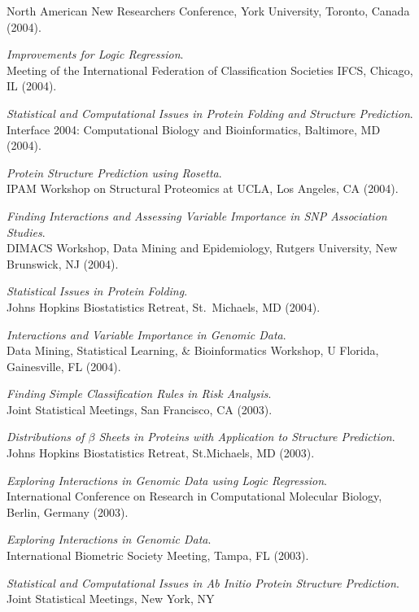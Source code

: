 \documentclass[10pt]{article}
\newcommand{\dn}[1]{{\color{black} {#1}}}
\begin{document}
North American New Researchers Conference, York University, \dn{Toronto, Canada}
(2004).
\item
{\it Improvements for Logic Regression}.\\
Meeting of the International Federation of Classification Societies IFCS, \dn{Chicago, IL}
(2004).
\item
{\it Statistical and Computational Issues in Protein Folding and Structure Prediction}.\\
Interface 2004: Computational Biology and Bioinformatics, \dn{Baltimore, MD}
(2004).
\item
{\it Protein Structure Prediction using Rosetta}.\\
IPAM Workshop on Structural Proteomics at UCLA, \dn{Los Angeles, CA}
(2004).
\item
{\it Finding Interactions and Assessing Variable Importance in SNP Association Studies}.\\
DIMACS Workshop, Data Mining and Epidemiology, Rutgers University, \dn{New Brunswick, NJ}
(2004).
\item
{\it Statistical Issues in Protein Folding}.\\
Johns Hopkins Biostatistics Retreat, St.~Michaels, MD
(2004).
\item
{\it Interactions and Variable Importance in Genomic Data}.\\
Data Mining, Statistical Learning, \& Bioinformatics Workshop, U Florida, Gainesville, FL
(2004).  
\item
{\it Finding Simple Classification Rules in Risk Analysis}.\\
Joint Statistical Meetings, \dn{San Francisco, CA}
(2003).
\item
{\it Distributions of $\beta$ Sheets in Proteins with Application to Structure Prediction}.\\
Johns Hopkins Biostatistics Retreat, St.Michaels, MD
(2003).
\item
{\it Exploring Interactions in Genomic Data using Logic Regression}.\\
International Conference on Research in Computational Molecular Biology, Berlin, Germany
(2003).
\item
{\it Exploring Interactions in Genomic Data}.\\
International Biometric Society Meeting, \dn{Tampa, FL}
(2003).
\item
{\it Statistical and Computational Issues in Ab Initio Protein Structure Prediction}.\\
Joint Statistical Meetings, \dn{New York, NY}
\end{document}
